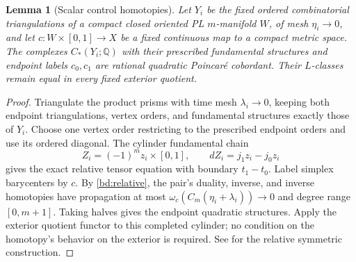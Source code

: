 \documentclass[11pt]{amsart}
\numberwithin{equation}{section}
\newtheorem{lemma}[lemma]{Lemma}
\theoremstyle{definition}
\theoremstyle{remark}
\newcommand{\Q}{\mathbb Q}
\begin{document}
\begin{lemma}[Scalar control homotopies]\label{bd:homotopy}
Let $Y_i$ be the fixed ordered combinatorial triangulations of a compact closed
oriented PL $m$-manifold $W$, of mesh $\eta_i\to0$, and let
$c:W\times[0,1]\to X$ be a fixed continuous map to a compact metric
space. The complexes $C_*(Y_i;\Q)$ with their prescribed fundamental
structures and endpoint labels $c_0,c_1$ are rational quadratic
Poincar\'e cobordant. Their $L$-classes remain equal in every fixed
exterior quotient.
\end{lemma}
\begin{proof}
Triangulate the product prisms with time mesh $\lambda_i\to0$, keeping
both endpoint triangulations, vertex orders, and fundamental structures
exactly those of $Y_i$. Choose one vertex order restricting to the
prescribed endpoint orders and use its ordered diagonal. The cylinder
fundamental chain
\[
 Z_i=(-1)^m z_i\times[0,1],\qquad
 dZ_i=j_1z_i-j_0z_i
\]
gives the exact relative tensor equation with boundary $t_1-t_0$.
Label simplex barycenters by $c$. By \cref{bd:relative}, the pair's
duality, inverse, and inverse homotopies have propagation at most
$\omega_c(C_m(\eta_i+\lambda_i))\to0$ and degree range $[0,m+1]$.
Taking halves gives the endpoint quadratic structures. Apply the
exterior quotient functor to this completed cylinder; no condition on
the homotopy's behavior on the exterior is required.
See \cite[Propositions 6.1--6.3]{Ran80II} for the relative symmetric
construction.
\end{proof}
\end{document}

